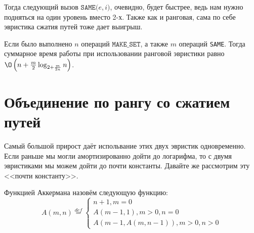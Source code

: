 \begin{figure}[H]
    \centering
\end{figure}

Тогда следующий вызов $\texttt{SAME(}e, i\texttt{)}$, очевидно, будет быстрее, ведь нам нужно подняться на один уровень вместо 2-х. 
Также как и ранговая, сама по себе эвристика сжатия путей тоже дает выигрыш.

\ThBd Если было выполнено $n$ операций $\texttt{MAKE\_SET}$, а также $m$ операций \texttt{SAME}. Тогда суммарное время работы при использовании ранговой эвристики равно $\O\left(n + \frac{m}{2} \log_{2 + \frac{m}{2n}} n \right)$.

\section{Объединение по рангу со сжатием путей}

Самый большой прирост даёт испольвание этих двух эвристик одновременно. Если раньше мы могли амортизированно дойти до логарифма, то с двумя эвристиками мы можем дойти до почти константы.
Давайте же рассмотрим эту <<почти константу>>.

\Def Функцией Аккермана назовём следующую функцию:
\begin{equation*}
    A(m, n) \overset{def}{=} \begin{cases}
        n + 1, m = 0 \\
        A(m - 1, 1), m > 0, n = 0\\
        A(m - 1, A(m, n - 1)), m > 0, n > 0
    \end{cases}
\end{equation*}

